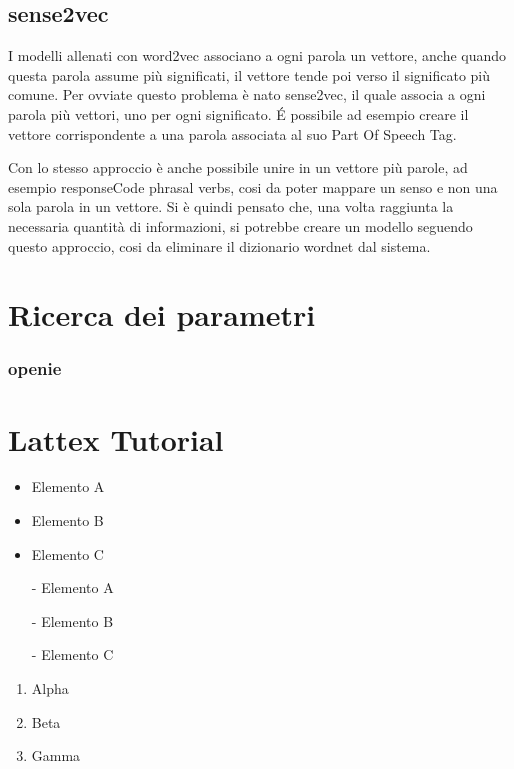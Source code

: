\documentclass[twoside]{supsistudent}
\begin{document}
\section{sense2vec}
I modelli allenati con word2vec associano a ogni parola un vettore, anche quando questa parola assume più significati, il vettore tende poi verso il significato più comune. Per ovviate questo problema è nato sense2vec, il quale associa a ogni parola più vettori, uno per ogni significato. É possibile ad esempio creare il vettore corrispondente a una parola associata al suo Part Of Speech Tag.  \cite{posCategories} \cite{sense2vec} 

Con lo stesso approccio è anche possibile unire in un vettore più parole, ad esempio responseCode phrasal verbs, cosi da poter mappare un senso e non una sola parola in un vettore. Si è quindi pensato che, una volta raggiunta la necessaria quantità di informazioni, si potrebbe creare un modello seguendo questo approccio, cosi da eliminare il dizionario wordnet dal sistema.


\chapter{Ricerca dei parametri}
\subsection{openie}

\chapter{Lattex Tutorial}
\lipsum[13]

\begin{itemize}
  \item Elemento A
  \item Elemento B
  \item Elemento C
\end{itemize}

\begin{itemize}
  \item[-] Elemento A
  \item[-] Elemento B
  \item[-] Elemento C
\end{itemize}

\begin{enumerate}
 \item Alpha
  \item Beta
  \item Gamma
\end{enumerate}
\end{document}
